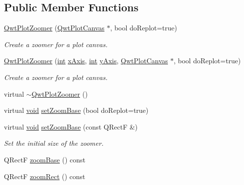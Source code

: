 \subsection*{Public Member Functions}
\begin{DoxyCompactItemize}
\item 
\hyperlink{class_qwt_plot_zoomer_a07f5135e421d2aab3f06542ff1320ece}{Qwt\-Plot\-Zoomer} (\hyperlink{class_qwt_plot_canvas}{Qwt\-Plot\-Canvas} $\ast$, bool do\-Replot=true)
\begin{DoxyCompactList}\small\item\em Create a zoomer for a plot canvas. \end{DoxyCompactList}\item 
\hyperlink{class_qwt_plot_zoomer_ab64adf928b11ec8f441098a551e437b4}{Qwt\-Plot\-Zoomer} (\hyperlink{ioapi_8h_a787fa3cf048117ba7123753c1e74fcd6}{int} \hyperlink{class_qwt_plot_picker_a9cdd6d56e990173a00c6c81edbe8818d}{x\-Axis}, \hyperlink{ioapi_8h_a787fa3cf048117ba7123753c1e74fcd6}{int} \hyperlink{class_qwt_plot_picker_a3068fb734845abfdf5dff00ead18377f}{y\-Axis}, \hyperlink{class_qwt_plot_canvas}{Qwt\-Plot\-Canvas} $\ast$, bool do\-Replot=true)
\begin{DoxyCompactList}\small\item\em Create a zoomer for a plot canvas. \end{DoxyCompactList}\item 
virtual \hyperlink{class_qwt_plot_zoomer_a3af28fe93e0098ce8d09222a7976f254}{$\sim$\-Qwt\-Plot\-Zoomer} ()
\item 
virtual \hyperlink{group___u_a_v_objects_plugin_ga444cf2ff3f0ecbe028adce838d373f5c}{void} \hyperlink{class_qwt_plot_zoomer_a7ee4f2a0606df6e85258c52f0b5c7bc2}{set\-Zoom\-Base} (bool do\-Replot=true)
\item 
virtual \hyperlink{group___u_a_v_objects_plugin_ga444cf2ff3f0ecbe028adce838d373f5c}{void} \hyperlink{class_qwt_plot_zoomer_a4376cd882cf72e1794cbbe7264ee96fb}{set\-Zoom\-Base} (const Q\-Rect\-F \&)
\begin{DoxyCompactList}\small\item\em Set the initial size of the zoomer. \end{DoxyCompactList}\item 
Q\-Rect\-F \hyperlink{class_qwt_plot_zoomer_ab0edba67626ca0c6c0632b38b1f67921}{zoom\-Base} () const 
\item 
Q\-Rect\-F \hyperlink{class_qwt_plot_zoomer_a91a2d1f0609666322dd955d3366cfbf0}{zoom\-Rect} () const 
\item 

\end{DoxyCompactItemize}

